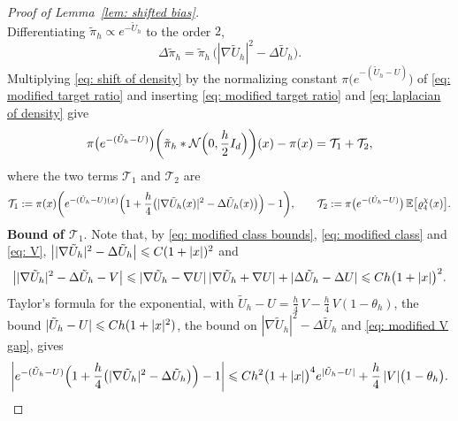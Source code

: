 \begin{proof}[Proof of Lemma~\ref{lem: shifted bias}]
\begin{equation}
        \label{eq: shift of density}
    \end{equation}
    Differentiating $\tilde\pi_h \propto e^{-\tilde U_h}$ to the order $2$,
    \begin{equation}
        \Delta \tilde\pi_h = \tilde\pi_h\, \bigl( |\nabla \tilde U_h|^2 - \Delta \tilde U_h \bigr) .
        \label{eq: laplacian of density}
    \end{equation}
    Multiplying \eqref{eq: shift of density} by the normalizing constant $\pi\bigl( e^{-(\tilde U_h - U)} \bigr)$ of \eqref{eq: modified target ratio} and inserting \eqref{eq: modified target ratio} and \eqref{eq: laplacian of density} give
    \begin{equation}
        \pi\bigl( e^{-(\tilde U_h - U)} \bigr) \biggl( \tilde\pi_h * \mathcal N\Bigl( 0, \frac h2 I_d \Bigr) \biggr)(x) - \pi(x) = \mathcal T_1 + \mathcal T_2 ,
        \label{eq: density split}
    \end{equation}
    where the two terms $\mathcal T_1$ and $\mathcal T_2$ are 
    \begin{equation*}
        \mathcal T_1 := \pi(x) \biggl( e^{-(\tilde U_h - U)(x)} \Bigl( 1 + \frac h4 \bigl( |\nabla \tilde U_h(x)|^2 - \Delta \tilde U_h(x) \bigr) \Bigr) - 1 \biggr) , \qquad
        \mathcal T_2 := \pi\bigl( e^{-(\tilde U_h - U)} \bigr)\, \mathbb E\bigl[ \varrho_4^{\chi}(x) \bigr] .
    \end{equation*}
	\textbf{Bound of $\mathcal T_1$}. Note that, by \eqref{eq: modified class bounds}, \eqref{eq: modified class} and \eqref{eq: V}, $\bigl| |\nabla \tilde U_h|^2 - \Delta \tilde U_h \bigr| \leqslant C (1 + |x|)^2$ and
    \begin{equation}
        \bigl| |\nabla \tilde U_h|^2 - \Delta \tilde U_h - V \bigr| \leqslant |\nabla \tilde U_h - \nabla U|\, |\nabla \tilde U_h + \nabla U| + |\Delta \tilde U_h - \Delta U| \leqslant C h \bigl( 1 + |x| \bigr)^2 .
        \label{eq: modified V gap}
    \end{equation}
    Taylor's formula for the exponential, with $\tilde U_h - U = \frac h4\, V - \frac h4\, V (1 - \theta_h)$, the bound $|\tilde U_h - U| \leqslant C h (1 + |x|^2)$, the bound on $|\nabla \tilde U_h|^2 - \Delta \tilde U_h$ and \eqref{eq: modified V gap}, gives
    \begin{equation}
        \biggl| e^{-(\tilde U_h - U)} \Bigl( 1 + \frac h4 \bigl( |\nabla \tilde U_h|^2 - \Delta \tilde U_h \bigr) \Bigr) - 1 \biggr|
        \Le C h^2 \bigl( 1 + |x| \bigr)^4 e^{|\tilde U_h - U|} + \frac h4\, |V| \bigl( 1 - \theta_h \bigr) .
        \label{eq: factor bound}

\end{equation}
\end{proof}
